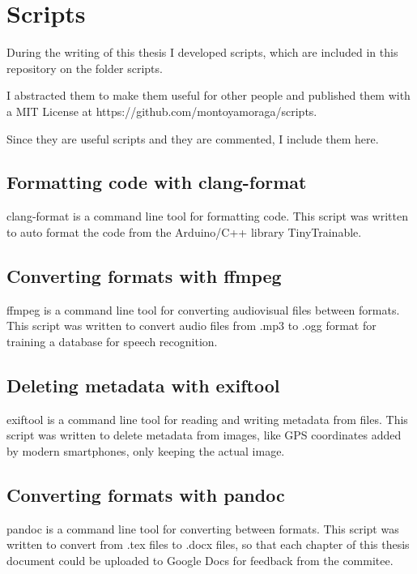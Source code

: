\chapter{Scripts}

During the writing of this thesis I developed scripts, which are included in this repository on the folder scripts.

I abstracted them to make them useful for other people and published them with a MIT License at https://github.com/montoyamoraga/scripts.

Since they are useful scripts and they are commented, I include them here.

\section{Formatting code with clang-format}

clang-format is a command line tool for formatting code. This script was written to auto format the code from the Arduino/C++ library TinyTrainable.



\section{Converting formats with ffmpeg}

ffmpeg is a command line tool for converting audiovisual files between formats. This script was written to convert audio files from .mp3 to .ogg format for training a database for speech recognition.



\section{Deleting metadata with exiftool}

exiftool is a command line tool for reading and writing metadata from files. This script was written to delete metadata from images, like GPS coordinates added by modern smartphones, only keeping the actual image.



\section{Converting formats with pandoc}

pandoc is a command line tool for converting between formats. This script was written to convert from .tex files to .docx files, so that each chapter of this thesis document could be uploaded to Google Docs for feedback from the commitee.


